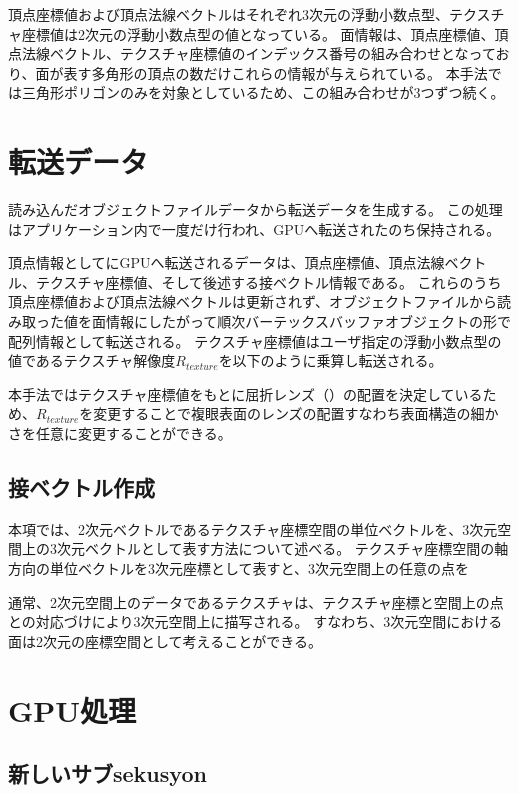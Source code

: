 頂点座標値および頂点法線ベクトルはそれぞれ3次元の浮動小数点型、テクスチャ座標値は2次元の浮動小数点型の値となっている。
面情報は、頂点座標値、頂点法線ベクトル、テクスチャ座標値のインデックス番号の組み合わせとなっており、面が表す多角形の頂点の数だけこれらの情報が与えられている。
本手法では三角形ポリゴンのみを対象としているため、この組み合わせが3つずつ続く。

\section{転送データ}
\label{SObjfile}

読み込んだオブジェクトファイルデータから転送データを生成する。
この処理はアプリケーション内で一度だけ行われ、GPUへ転送されたのち保持される。

頂点情報としてにGPUへ転送されるデータは、頂点座標値、頂点法線ベクトル、テクスチャ座標値、そして後述する接ベクトル情報である。
これらのうち頂点座標値および頂点法線ベクトルは更新されず、オブジェクトファイルから読み取った値を面情報にしたがって順次バーテックスバッファオブジェクトの形で配列情報として転送される。
テクスチャ座標値はユーザ指定の浮動小数点型の値であるテクスチャ解像度$R_{texture}$を以下のように乗算し転送される。


本手法ではテクスチャ座標値をもとに屈折レンズ（）の配置を決定しているため、$R_{texture}$を変更することで複眼表面のレンズの配置すなわち表面構造の細かさを任意に変更することができる。


\subsection{接ベクトル作成}
\label{SSTangent}

本項では、2次元ベクトルであるテクスチャ座標空間の単位ベクトルを、3次元空間上の3次元ベクトルとして表す方法について述べる。
テクスチャ座標空間の軸方向の単位ベクトルを3次元座標として表すと、3次元空間上の任意の点を

通常、2次元空間上のデータであるテクスチャは、テクスチャ座標と空間上の点との対応づけにより3次元空間上に描写される。
すなわち、3次元空間における面は2次元の座標空間として考えることができる。




\section{GPU処理}
\label{SGpumethod}

\subsection{新しいサブsekusyon}
\label{SS}
